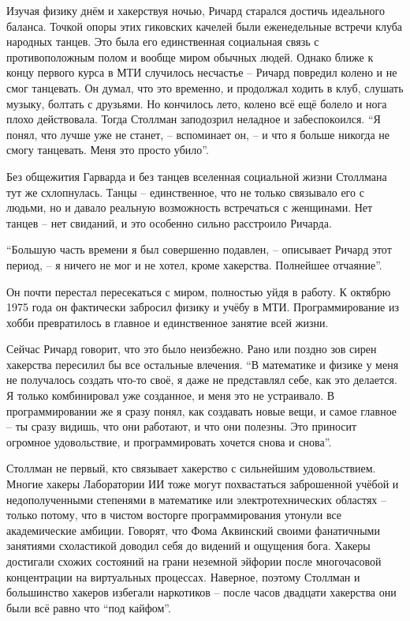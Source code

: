 Изучая физику днём и хакерствуя ночью, Ричард старался достичь идеального баланса. Точкой опоры этих гиковских качелей были еженедельные встречи клуба народных танцев. Это была его единственная социальная связь с противоположным полом и вообще миром обычных людей. Однако ближе к концу первого курса в МТИ случилось несчастье -- Ричард повредил колено и не смог танцевать. Он думал, что это временно, и продолжал ходить в клуб, слушать музыку, болтать с друзьями. Но кончилось лето, колено всё ещё болело и нога плохо действовала. Тогда Столлман заподозрил неладное и забеспокоился. \enquote{Я понял, что лучше уже не станет, -- вспоминает он, -- и что я больше никогда не смогу танцевать. Меня это просто убило}.

Без общежития Гарварда и без танцев вселенная социальной жизни Столлмана тут же схлопнулась. Танцы -- единственное, что не только связывало его с людьми, но и давало реальную возможность встречаться с женщинами. Нет танцев -- нет свиданий, и это особенно сильно расстроило Ричарда.

\enquote{Большую часть времени я был совершенно подавлен, -- описывает Ричард этот период, -- я ничего не мог и не хотел, кроме хакерства. Полнейшее отчаяние}.

Он почти перестал пересекаться с миром, полностью уйдя в работу. К октябрю 1975 года он фактически забросил физику и учёбу в МТИ. Программирование из хобби превратилось в главное и единственное занятие всей жизни.

Сейчас Ричард говорит, что это было неизбежно. Рано или поздно зов сирен хакерства пересилил бы все остальные влечения. \enquote{В математике и физике у меня не получалось создать что-то своё, я даже не представлял себе, как это делается. Я только комбинировал уже созданное, и меня это не устраивало. В программировании же я сразу понял, как создавать новые вещи, и самое главное -- ты сразу видишь, что они работают, и что они полезны. Это приносит огромное удовольствие, и программировать хочется снова и снова}.

Столлман не первый, кто связывает хакерство с сильнейшим удовольствием. Многие хакеры Лаборатории ИИ тоже могут похвастаться заброшенной учёбой и недополученными степенями в математике или электротехнических областях -- только потому, что в чистом восторге программирования утонули все академические амбиции. Говорят, что Фома Аквинский своими фанатичными занятиями схоластикой доводил себя до видений и ощущения бога. Хакеры достигали схожих состояний на грани неземной эйфории после многочасовой концентрации на виртуальных процессах. Наверное, поэтому Столлман и большинство хакеров избегали наркотиков -- после часов двадцати хакерства они были всё равно что \enquote{под кайфом}.

